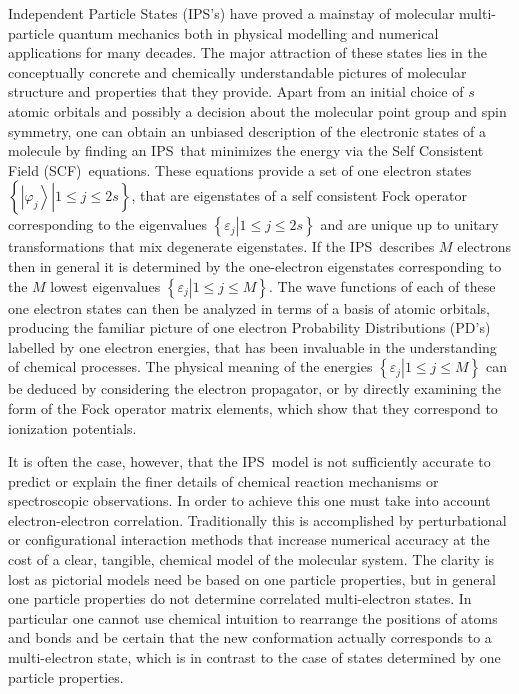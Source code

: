 \documentclass[titlepage]{article}%
\begin{document}
Independent Particle States (IPS's) have proved a mainstay of molecular
multi-particle quantum mechanics both in physical modelling and numerical
applications for many decades. The major attraction of these states lies in
the conceptually concrete and chemically understandable pictures of molecular
structure and properties that they provide. Apart from an initial choice of
$s$ atomic orbitals and possibly a decision about the molecular point group
and spin symmetry, one can obtain an unbiased description of the electronic
states of a molecule by finding an IPS\ that minimizes the energy via the Self
Consistent Field (SCF)\ equations. These equations provide a set of one
electron states $\left\{  \left.  \left\vert \varphi_{j}\right\rangle
\right\vert 1\leq j\leq2s\right\}  $, that are eigenstates of a self
consistent Fock operator corresponding to the eigenvalues $\left\{  \left.
\varepsilon_{j}\right\vert 1\leq j\leq2s\right\}  $ and are unique up to
unitary transformations that mix degenerate eigenstates. If the IPS\ describes
$M$ electrons then in general it is determined by the one-electron eigenstates
corresponding to the $M$ lowest eigenvalues $\left\{  \left.  \varepsilon
_{j}\right\vert 1\leq j\leq M\right\}  $. The wave functions of each of these
one electron states can then be analyzed in terms of a basis of atomic
orbitals, producing the familiar picture of one electron Probability
Distributions (PD's) labelled by one electron energies, that has been
invaluable in the understanding of chemical processes. The physical meaning of
the energies $\left\{  \left.  \varepsilon_{j}\right\vert 1\leq j\leq
M\right\}  $ can be deduced by considering the electron propagator, or by
directly examining the form of the Fock operator matrix elements, which show
that they correspond to ionization potentials.

It is often the case, however, that the IPS\ model is not sufficiently
accurate to predict or explain the finer details of chemical reaction
mechanisms or spectroscopic observations. In order to achieve this one must
take into account electron-electron correlation. Traditionally this is
accomplished by perturbational or configurational interaction methods that
increase numerical accuracy at the cost of a clear, tangible, chemical model
of the molecular system. The clarity is lost as pictorial models need be based
on one particle properties, but in general one particle properties do not
determine correlated multi-electron states. In particular one cannot use
chemical intuition to rearrange the positions of atoms and bonds and be
certain that the new conformation actually corresponds to a multi-electron
state, which is in contrast to the case of states determined by one particle properties.
\end{document}
